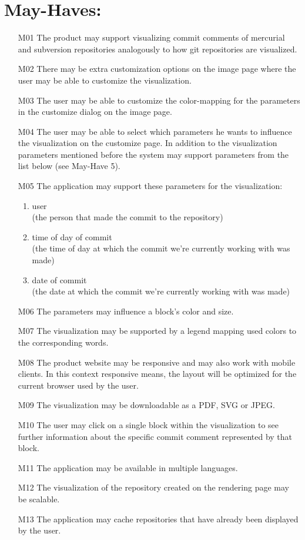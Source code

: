 \documentclass[12pt]{scrartcl}
\begin{document}
\section{May-Haves:}
\begin{enumerate}
\item [M01] The product may support visualizing commit comments of mercurial and
	subversion repositories analogously to how git repositories are
	visualized.
\item [M02] There may be extra customization options on the image page where the user may be able to customize the visualization.
\item [M03] The user may be able to customize the color-mapping for the parameters in the customize dialog on the image page.
\item [M04] The user may be able to select which parameters he wants to influence the visualization on the customize page. In addition to the visualization parameters mentioned before the system may support parameters from the list below (see May-Have 5).
\item [M05] The application may support these parameters for the visualization:
\begin{enumerate}
\item user\\
(the person that made the commit to the repository)
\item time of day of commit\\
(the time of day at which the commit we're currently working with was made)
\item date of commit\\
(the date at which the commit we're currently working with was made)
\end{enumerate}
\item [M06] The parameters may influence a block's color and size.
\item [M07] The visualization may be supported by a legend mapping used colors to the corresponding words.
\item [M08] The product website may be responsive and may also work with mobile clients. In this context responsive means, the layout will be optimized for the current browser used by the user.
\item [M09] The visualization may be downloadable as a PDF, SVG or JPEG.
\item [M10] The user may click on a single block within the visualization to see further information about the specific commit comment represented by that block.
\item [M11] The application may be available in multiple languages.
\item [M12] The visualization of the repository created on the rendering page may be scalable.
\item [M13] The application may cache repositories that have already been displayed by the user.
\end{enumerate}
\end{document}
